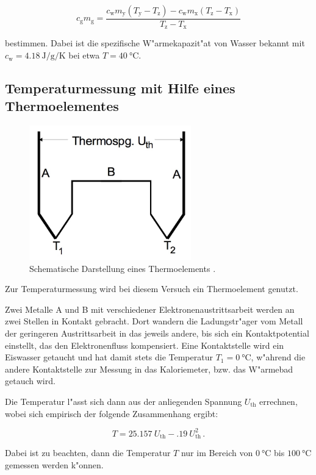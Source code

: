 		\begin{equation}
			c_\mathrm{g}m_\mathrm{g} = \frac{c_\mathrm{w}m_\mathrm{y}\left( T_\mathrm{y} - T_\mathrm{z}\right) - c_\mathrm{w}m_\mathrm{x} \left( T_\mathrm{z} - T_\mathrm{x} \right) }{T_\mathrm{z} - T_\mathrm{x}}
		\end{equation}

		bestimmen. Dabei ist die spezifische W"armekapazit"at von Wasser bekannt mit $c_\mathrm{w} = \SI{4.18}{\joule \per \gram \per \kelvin}$ \cite{anleitung} bei etwa $T = \SI{40}{\celsius}$.

	\subsection{Temperaturmessung mit Hilfe eines Thermoelementes}
	\label{subsec:thermoelement}
		\begin{figure}
			\centering
			\includegraphics[width = 7cm]{img/thermoelement.jpg}
			\caption{Schematische Darstellung eines Thermoelements \cite{anleitung}.}
			\label{fig:thermoelement}
		\end{figure}

		Zur Temperaturmessung wird bei diesem Versuch ein Thermoelement genutzt.

		Zwei Metalle A und B mit verschiedener Elektronenaustrittsarbeit werden an zwei Stellen in Kontakt gebracht.
		Dort wandern die Ladungstr"ager vom Metall der geringeren Austrittsarbeit in das jeweils andere, bis sich ein Kontaktpotential einstellt, das den Elektronenfluss kompensiert.
		Eine Kontaktstelle wird ein Eiswasser getaucht und hat damit stets die Temperatur $T_1 = \SI{0}{\celsius}$, w"ahrend die andere Kontaktstelle zur Messung in das Kaloriemeter, bzw. das W"armebad getauch wird.

		Die Temperatur l"asst sich dann aus der anliegenden Spannung $U_\mathrm{th}$ errechnen, wobei sich empirisch der folgende Zusammenhang ergibt:

		\begin{equation}
			T = \SI{25.157}{} U_\mathrm{th} - \SI{.19}{} U_\mathrm{th}^2 \,.
		\end{equation}

		Dabei ist zu beachten, dann die Temperatur $T$ nur im Bereich von $\SI{0}{\celsius}$ bis $\SI{100}{\celsius}$ gemessen werden k"onnen.